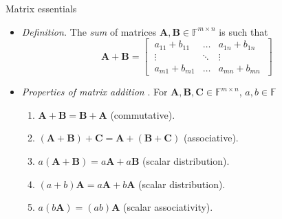 \documentclass{beamer}
\numberwithin{equation}{section}
\begin{document}
\begin{frame}{Matrix essentials}
    \begin{itemize}
        \item
        \textit{Definition.} The \textit{sum} of matrices 
        $ \mathbf{A}, \mathbf{B} \in \mathbb{F}^{m \times n }$ is such that
        \begin{equation*}
            \mathbf{A} + \mathbf{B} = \begin{bmatrix}
                \ a_{11} + b_{11} & \ldots & a_{1n} + b_{1n} \ \\
                \ \vdots & \ddots & \vdots \ \\
                \ a_{m1} + b_{m1} & \ldots & a_{mn} + b_{mn} \
            \end{bmatrix}
        \end{equation*}

        \item
        \textit{Properties of matrix addition} \cite{jacob_linalg}. For
        $ \mathbf{A}, \mathbf{B}, \mathbf{C} \in \mathbb{F}^{m \times n} $,
        $ a, b \in \mathbb{F} $
        \begin{enumerate}
            \item
            $ \mathbf{A} + \mathbf{B} = \mathbf{B} + \mathbf{A} $
            (commutative).

            \item
            $ (\mathbf{A} + \mathbf{B}) + \mathbf{C} = \mathbf{A} +
            (\mathbf{B} + \mathbf{C}) $ (associative).

            \item
            $ a(\mathbf{A} + \mathbf{B}) = a\mathbf{A} + a\mathbf{B} $ (scalar
            distribution).

            \item
            $ (a + b)\mathbf{A} = a\mathbf{A} + b\mathbf{A} $ (scalar
            distribution).

            \item
            $ a(b\mathbf{A}) = (ab)\mathbf{A} $ (scalar associativity).
        \end{enumerate}
    \end{itemize}
\end{frame}
\end{document}
